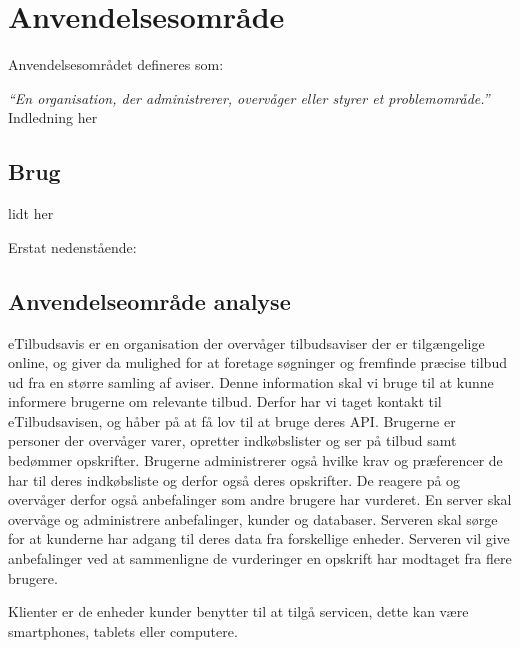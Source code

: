 \section{Anvendelsesområde}
Anvendelsesområdet defineres som:

\textit{``En organisation, der administrerer, overvåger eller styrer et problemområde.''}
Indledning her

\subsection{Brug}
lidt her


Erstat nedenstående:

\subsection{Anvendelseområde analyse}
eTilbudsavis er en organisation der overvåger tilbudsaviser der er tilgængelige online, og giver da mulighed for at foretage søgninger og fremfinde præcise tilbud ud fra en større samling af aviser.
Denne information skal vi bruge til at kunne informere brugerne om relevante tilbud.
Derfor har vi taget kontakt til eTilbudsavisen, og håber på at få lov til at bruge deres API.
Brugerne er personer der overvåger varer, opretter indkøbslister og ser på tilbud samt bedømmer opskrifter.
Brugerne administrerer også hvilke krav og præferencer de har til deres indkøbsliste og derfor også deres opskrifter.
De reagere på og overvåger derfor også anbefalinger som andre brugere har vurderet.
En server skal overvåge og administrere anbefalinger, kunder og databaser.
Serveren skal sørge  for at kunderne har adgang til deres data fra forskellige enheder.
Serveren vil give anbefalinger ved at sammenligne de vurderinger en opskrift har modtaget fra flere brugere.

Klienter er de enheder kunder benytter til at tilgå servicen, dette kan være smartphones, tablets eller computere.

